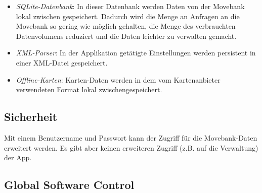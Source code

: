 \documentclass[12pt]{article} %
\begin{document}
\begin{itemize}
	\item \textit{SQLite-Datenbank}: In dieser Datenbank werden Daten von der Movebank lokal zwischen gespeichert. Dadurch wird die Menge an Anfragen an die Movebank so gering wie möglich gehalten, die Menge des verbrauchten Datenvolumens reduziert und die Daten leichter zu verwalten gemacht.
	
	\item \textit{XML-Parser}: In der Applikation getätigte Einstellungen werden persistent in einer XML-Datei gespeichert.
	
	\item \textit{Offline-Karten}: Karten-Daten werden in dem vom Kartenanbieter verwendeten Format lokal zwischengespeichert.
	
	
\end{itemize}



\subsection{Sicherheit}
Mit einem Benutzername und Passwort kann der Zugriff für die Movebank-Daten erweitert werden. Es gibt aber keinen erweiteren Zugriff (z.B. auf die Verwaltung) der App. 


\subsection{Global Software Control}
\end{document}
